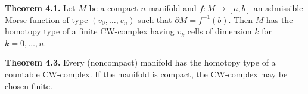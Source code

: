 \textbf{Theorem 4.1.} Let $M$ be a compact $n$-manifold and $f: M \rightarrow [a, b]$ an admissible Morse function of type $(v_0, \ldots, v_n)$ such that $\partial M = f^{-1}(b)$. Then $M$ has the homotopy type of a finite CW-complex having $v_k$ cells of dimension $k$ for $k = 0, \ldots, n$.

\textbf{Theorem 4.3.} Every (noncompact) manifold has the homotopy type of a countable CW-complex. If the manifold is compact, the CW-complex may be chosen finite.
